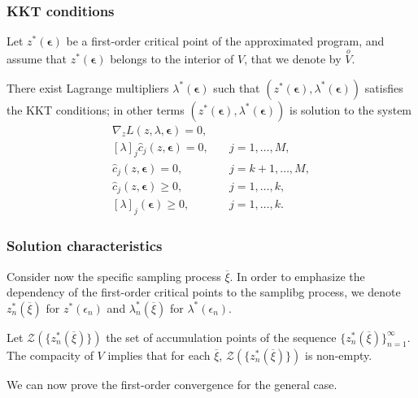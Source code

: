 \documentclass{beamer}
\def\bepsilon{\boldsymbol\epsilon}
\begin{document}
\begin{frame}
\frametitle{KKT conditions}

Let $z^*(\bepsilon)$ be a first-order critical point of the approximated program, and assume that $z^*(\bepsilon)$ belongs to the interior of $V$, that we denote by $\overset{o}{V}$.

\mbox{}

There exist Lagrange multipliers $\lambda^*(\boldsymbol{\epsilon})$ such that $(z^*(\boldsymbol{\epsilon}), \lambda^*(\boldsymbol{\epsilon}))$ satisfies the KKT conditions; in other terms $(z^*(\boldsymbol{\epsilon}), \lambda^*(\boldsymbol{\epsilon}))$ is solution to the system
\[
\begin{aligned}
\nabla_z L(z, \lambda, \boldsymbol{\epsilon}) = 0,\\
[\lambda]_j\hat{c}_j(z, \boldsymbol{\epsilon}) = 0, &\quad j = 1,\ldots,M,\\
\hat{c}_j(z, \boldsymbol{\epsilon}) = 0, &\quad j = k+1,\ldots,M,\\
\hat{c}_j(z, \boldsymbol{\epsilon}) \geq 0, &\quad j = 1,\ldots,k,\\
[\lambda]_j(\boldsymbol{\epsilon}) \geq 0, &\quad j = 1,\ldots,k.
\end{aligned}
\]

\end{frame}

\begin{frame}
\frametitle{Solution characteristics}

Consider now the specific sampling process $\overline{\xi}$.
In order to emphasize the dependency of the first-order critical points to the samplibg process, we denote $z_n^*(\overline{\xi})$ for $z^*(\epsilon_n)$ and $\lambda_n^*(\overline{\xi})$ for $\lambda^*(\epsilon_n)$.

\mbox{}

Let $\mathcal{Z}\left(\lbrace z^*_n(\overline{\xi})\rbrace\right)$ the set of accumulation points of the sequence $\lbrace z_n^*(\overline{\xi}) \rbrace_{n = 1}^{\infty}$.
The compacity of $V$ implies that for each $\overline{\xi}$, %
$\mathcal{Z}\left(\lbrace z^*_n(\overline{\xi})\rbrace\right)$ is non-empty.

\mbox{}

We can now prove the first-order convergence for the general case.

\end{frame}
\end{document}

